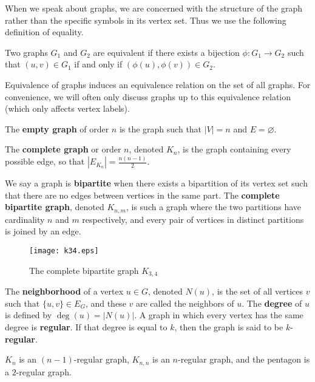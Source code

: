 When we speak about graphs, we are concerned with the structure of the graph
rather than the specific symbols in its vertex set. Thus we use the following
definition of equality.

\begin{definition}
  Two graphs $G_1$ and $G_2$ are equivalent if there exists a bijection $\phi : G_1 \to G_2$
  such that $(u,v) \in G_1$ if and only if $(\phi(u),\phi(v)) \in G_2$.
\end{definition}

Equivalence of graphs induces an equivalence relation on the set of all graphs. For convenience, we
will often only discuss graphs up to this equivalence relation (which only affects vertex labels).

\begin{example}
  The \textbf{empty graph} of order $n$ is the graph such that $|V| = n$ and $E
  = \varnothing$.

  The \textbf{complete graph} or order $n$, denoted $K_n$, is the graph containing every possible
  edge, so that $|E_{K_n}| = \frac{n(n-1)}{2}$.

  We say a graph is \textbf{bipartite} when there exists a bipartition of its vertex set such that
  there are no edges between vertices in the same part. The \textbf{complete bipartite graph},
  denoted $K_{n,m}$, is such a graph where the two partitions have cardinality $n$ and $m$
  respectively, and every pair of vertices in distinct partitions is joined by an edge.
\end{example}

\begin{figure}[H]
  \centering
  \texttt{[image: k34.eps]}
  \caption{The complete bipartite graph $K_{3,4}$}
  \label{fig:k34}
\end{figure}

\begin{definition}
  The \textbf{neighborhood} of a vertex $u \in G$, denoted $N(u)$, is the set of all vertices $v$
  such that $\{u,v\} \in E_G$, and these $v$ are called the neighbors of $u$. The \textbf{degree} of
  $u$ is defined by $\deg(u) = |N(u)|$. A graph in which every vertex has the same degree is
  \textbf{regular}. If that degree is equal to $k$, then the graph is said to be $k$-\textbf{regular}.
\end{definition}

\begin{example}
  $K_n$ is an $(n-1)$-regular graph, $K_{n,n}$ is an $n$-regular graph, and the pentagon is a
  $2$-regular graph.
\end{example}

